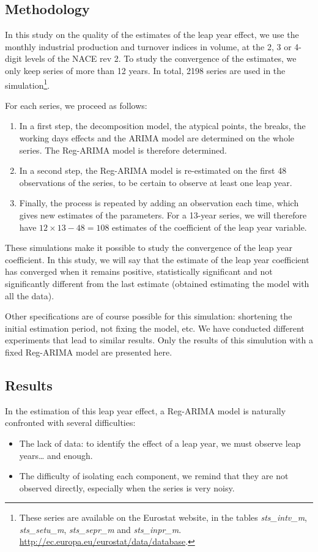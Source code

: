\documentclass[12pt, a4paper]{article}
\begin{document}
\subsection{Methodology}

In this study on the quality of the estimates of the leap year effect, we use the monthly industrial production and turnover indices in volume, at the 2, 3 or 4-digit levels of the NACE rev 2. To study the convergence of the estimates, we only keep series of more than 12 years. In total, 2198 series are used in the simulation\footnote{These series are available on the Eurostat website, in the tables \emph{sts\_intv\_m}, \emph{sts\_setu\_m}, \emph{sts\_sepr\_m} and \emph{sts\_inpr\_m}. \url{http://ec.europa.eu/eurostat/data/database}.}.

For each series, we proceed as follows:
\begin{enumerate}
	\item In a first step, the decomposition model, the atypical points, the breaks, the  working days effects and the ARIMA model are determined on the whole series. The Reg-ARIMA model is therefore determined.
	\item In a second step, the Reg-ARIMA model is re-estimated on the first 48 observations of the series, to be certain to observe at least one leap year.
	\item Finally, the process is repeated by adding an observation each time, which gives new estimates of the parameters. For a 13-year series, we will therefore have  $12\times 13 - 48 = 108$ estimates of the coefficient of the leap year variable.
\end{enumerate}
These simulations make it possible to study the convergence of the leap year coefficient. In this study, we will say that the estimate of the leap year coefficient has converged when it remains positive, statistically significant and not significantly different from the last estimate (obtained estimating the model with all the data).

Other specifications are of course possible for this simulation: shortening the initial estimation period, not fixing the model, etc. We have conducted different experiments that lead to similar results. Only the results of this simulution with a fixed Reg-ARIMA model are presented here.

\subsection{Results}
In the estimation of this leap year effect, a Reg-ARIMA model is naturally confronted with several difficulties:
\begin{itemize}
	\item The lack of data: to identify the effect of a leap year, we must observe leap years\dots{} and enough.
	\item The difficulty of isolating each component, we remind that they are not observed directly, especially when the series is very noisy.
\end{itemize}
\end{document}
